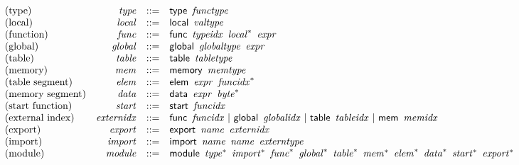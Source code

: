 \vspace{1ex}

$$
\begin{array}{@{}lrrl@{}l@{}}
\mbox{(type)} & {\mathit{type}} &::=& \mathsf{type}~\,{\mathit{functype}} \\
\mbox{(local)} & {\mathit{local}} &::=& \mathsf{local}~\,{\mathit{valtype}} \\
\mbox{(function)} & {\mathit{func}} &::=& \mathsf{func}~\,{\mathit{typeidx}}~\,{{\mathit{local}}^\ast}~\,{\mathit{expr}} \\
\mbox{(global)} & {\mathit{global}} &::=& \mathsf{global}~\,{\mathit{globaltype}}~\,{\mathit{expr}} \\
\mbox{(table)} & {\mathit{table}} &::=& \mathsf{table}~\,{\mathit{tabletype}} \\
\mbox{(memory)} & {\mathit{mem}} &::=& \mathsf{memory}~\,{\mathit{memtype}} \\
\mbox{(table segment)} & {\mathit{elem}} &::=& \mathsf{elem}~\,{\mathit{expr}}~\,{{\mathit{funcidx}}^\ast} \\
\mbox{(memory segment)} & {\mathit{data}} &::=& \mathsf{data}~\,{\mathit{expr}}~\,{{\mathit{byte}}^\ast} \\
\mbox{(start function)} & {\mathit{start}} &::=& \mathsf{start}~\,{\mathit{funcidx}} \\
\mbox{(external index)} & {\mathit{externidx}} &::=& \mathsf{func}~\,{\mathit{funcidx}} ~|~ \mathsf{global}~\,{\mathit{globalidx}} ~|~ \mathsf{table}~\,{\mathit{tableidx}} ~|~ \mathsf{mem}~\,{\mathit{memidx}} \\
\mbox{(export)} & {\mathit{export}} &::=& \mathsf{export}~\,{\mathit{name}}~\,{\mathit{externidx}} \\
\mbox{(import)} & {\mathit{import}} &::=& \mathsf{import}~\,{\mathit{name}}~\,{\mathit{name}}~\,{\mathit{externtype}} \\
\mbox{(module)} & {\mathit{module}} &::=& \mathsf{module}~\,{{\mathit{type}}^\ast}~\,{{\mathit{import}}^\ast}~\,{{\mathit{func}}^\ast}~\,{{\mathit{global}}^\ast}~\,{{\mathit{table}}^\ast}~\,{{\mathit{mem}}^\ast}~\,{{\mathit{elem}}^\ast}~\,{{\mathit{data}}^\ast}~\,{{\mathit{start}}^\ast}~\,{{\mathit{export}}^\ast} \\
\end{array}
$$

\vspace{1ex}

\vspace{1ex}

\vspace{1ex}


